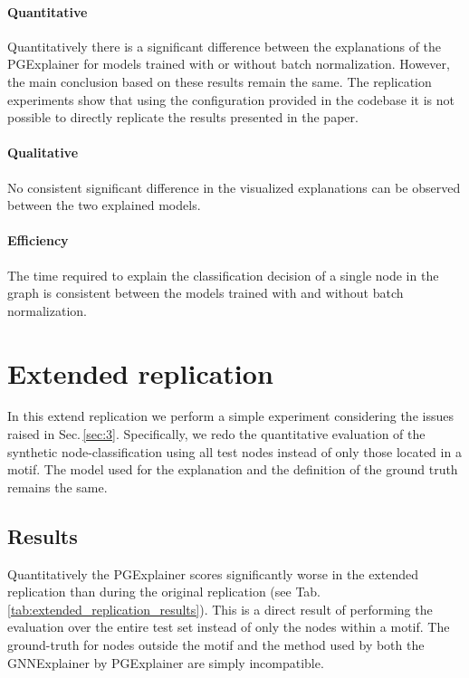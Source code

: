 \paragraph{Quantitative}
Quantitatively there is a significant difference between the explanations of the PGExplainer for models trained with or without batch normalization. However, the main conclusion based on these results remain the same. The replication experiments show that using the configuration provided in the codebase it is not possible to directly replicate the results presented in the paper. 


\paragraph{Qualitative}
No consistent significant difference in the visualized explanations can be observed between the two explained models. 

\paragraph{Efficiency}
The time required to explain the classification decision of a single node in the graph is consistent between the models trained with and without batch normalization. 

\section{Extended replication}\label{sec:extended_replication} 
In this extend replication we perform a simple experiment considering the issues raised in Sec.\,\ref{sec:3}. Specifically, we redo the quantitative evaluation of the synthetic node-classification using all test nodes instead of only those located in a motif. The model used for the explanation and the definition of the ground truth remains the same. 

\subsection{Results}
Quantitatively the PGExplainer scores significantly worse in the extended replication than during the original replication (see Tab.\,\ref{tab:extended_replication_results}). This is a direct result of performing the evaluation over the entire test set instead of only the nodes within a motif. The ground-truth for nodes outside the motif and the method used by both the GNNExplainer by PGExplainer are simply incompatible. 

